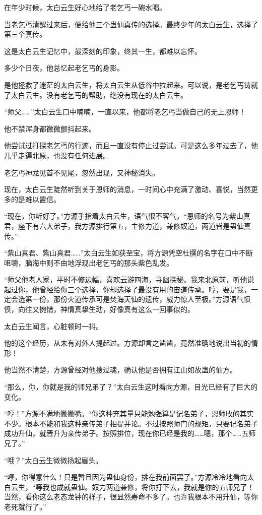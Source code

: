 \begin{this_body}
在年少时候，太白云生好心地给了老乞丐一碗水喝。

当老乞丐清醒过来后，便给他三个蛊仙真传的选择。最终少年的太白云生，选择了第三个真传。

这是太白云生记忆中，最深刻的印象，终其一生，都难以忘怀。

多少个日夜，他总忆起老乞丐的身影。

是他拯救了迷茫的太白云生，将太白云生从低谷中拉起来。可以说，是老乞丐铸就了太白云生。没有老乞丐的帮助，绝没有现在的太白云生。

“师父……”太白云生口中喃喃，一直以来，他都将老乞丐当做自己的无上恩师！

他不禁浑身都微微颤抖起来。

他尝试过打探老乞丐的行迹，而且一直没有停止过尝试。可是这么多年过去了，他几乎走遍北原，也没有任何进展。

老乞丐神龙见首不见尾，忽然出现，又神秘消失。

现在，太白云生陡然听到关于恩师的消息，一时间心中充满了激动、喜悦，当然更多的是难以置信。

“现在，你听好了。”方源手指着太白云生，语气很不客气，“恩师的名号为紫山真君，座下有六大弟子，我方源排行第五，主修力道，兼修奴道，两道皆是蛊仙真传。”

“紫山真君、紫山真君……”太白云生如获至宝，将方源凭空杜撰的名字在口中不断咀嚼，脑海中则不由地浮现出老乞丐的那头紫色乱发。

“师父他老人家，平时不修边幅，喜欢云游四海，寻幽探秘。我来北原前，听他说起过你，他曾经给你三个选择，你却选择了最没有用的宙道传承。哼，要是我，一定会选第一份，那份火道传承可是焚海天仙的遗传，威力惊人至极。”方源语气愤愤，向往又惋惜，神情真挚生动，好像真有这么一回事似的。

太白云生闻言，心脏顿时一抖。

他的这个经历，从未有对外人提起过。方源却言之凿凿，竟然准确地说出当初的情形！

他当然不清楚，方源曾经对他搜过魂，确认他是否拥有江山如故蛊的仙方。

“那么，你，你就是我的师兄弟了？”太白云生这时看向方源，目光已经有了巨大的变化。

“哼！”方源不满地撇撇嘴。“你这种充其量只能勉强算是记名弟子，恩师收的其实不少。根本不能和我这种亲传弟子相提并论。不过按照师门的规矩，只要记名弟子成功升仙，就晋升为亲传弟子。按照排位，现在你已经是我的……嗯，那个……五师兄了。”

“哦？”太白云生微微扬起眉头。

“哼，你得意什么！只是暂且因为蛊仙身份，排在我前面罢了。”方源冷冷地看向太白云生，“等我也成就蛊仙。奴力两道兼修，将你打下去，我就是你的五师兄了！当然，看你这么老态龙钟的样子，很显然寿命不多了。也许我根本不用升仙，等你老死就行了。”


\end{this_body}
